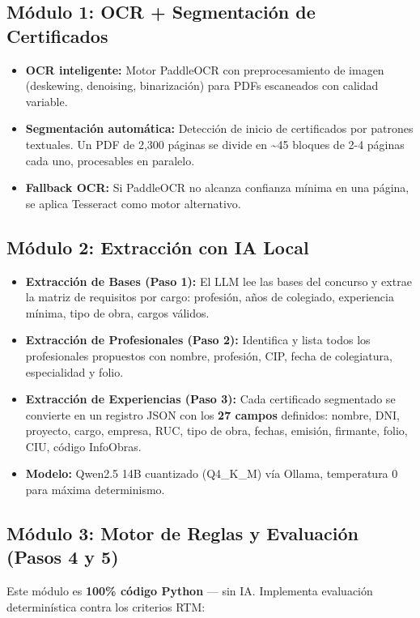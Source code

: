 \documentclass[11pt,a4paper]{article}
\begin{document}
\subsection{Módulo 1: OCR + Segmentación de Certificados}
\begin{itemize}[leftmargin=*]
    \item \textbf{OCR inteligente:} Motor PaddleOCR con preprocesamiento de imagen (deskewing, denoising, binarización) para PDFs escaneados con calidad variable.
    \item \textbf{Segmentación automática:} Detección de inicio de certificados por patrones textuales. Un PDF de 2,300 páginas se divide en \textasciitilde45 bloques de 2-4 páginas cada uno, procesables en paralelo.
    \item \textbf{Fallback OCR:} Si PaddleOCR no alcanza confianza mínima en una página, se aplica Tesseract como motor alternativo.
\end{itemize}

\subsection{Módulo 2: Extracción con IA Local}
\begin{itemize}[leftmargin=*]
    \item \textbf{Extracción de Bases (Paso 1):} El LLM lee las bases del concurso y extrae la matriz de requisitos por cargo: profesión, años de colegiado, experiencia mínima, tipo de obra, cargos válidos.
    \item \textbf{Extracción de Profesionales (Paso 2):} Identifica y lista todos los profesionales propuestos con nombre, profesión, CIP, fecha de colegiatura, especialidad y folio.
    \item \textbf{Extracción de Experiencias (Paso 3):} Cada certificado segmentado se convierte en un registro JSON con los \textbf{27 campos} definidos: nombre, DNI, proyecto, cargo, empresa, RUC, tipo de obra, fechas, emisión, firmante, folio, CIU, código InfoObras.
    \item \textbf{Modelo:} Qwen2.5 14B cuantizado (Q4\_K\_M) vía Ollama, temperatura 0 para máxima determinismo.
\end{itemize}

\subsection{Módulo 3: Motor de Reglas y Evaluación (Pasos 4 y 5)}

Este módulo es \textbf{100\% código Python} — sin IA. Implementa evaluación determinística contra los criterios RTM:
\end{document}
